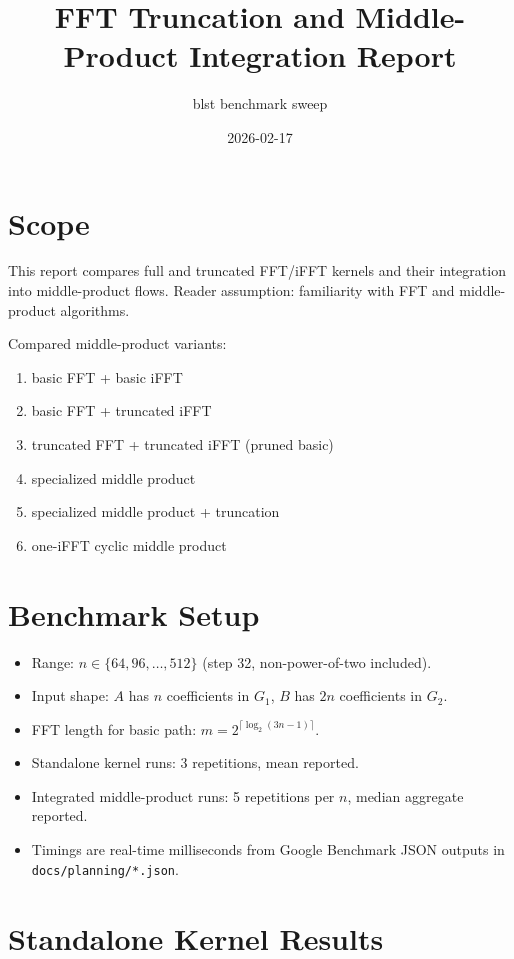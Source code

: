 \documentclass[11pt]{article}
\begin{document}
\title{FFT Truncation and Middle-Product Integration Report}
\author{blst benchmark sweep}
\date{2026-02-17}
\maketitle

\section{Scope}
This report compares full and truncated FFT/iFFT kernels and their integration into middle-product flows.
Reader assumption: familiarity with FFT and middle-product algorithms.

Compared middle-product variants:
\begin{enumerate}
\item basic FFT + basic iFFT
\item basic FFT + truncated iFFT
\item truncated FFT + truncated iFFT (pruned basic)
\item specialized middle product
\item specialized middle product + truncation
\item one-iFFT cyclic middle product
\end{enumerate}

\section{Benchmark Setup}
\begin{itemize}
\item Range: \(n \in \{64,96,\ldots,512\}\) (step 32, non-power-of-two included).
\item Input shape: \(A\) has \(n\) coefficients in \(G_1\), \(B\) has \(2n\) coefficients in \(G_2\).
\item FFT length for basic path: \(m = 2^{\lceil \log_2(3n-1) \rceil}\).
\item Standalone kernel runs: 3 repetitions, mean reported.
\item Integrated middle-product runs: 5 repetitions per \(n\), median aggregate reported.
\item Timings are real-time milliseconds from Google Benchmark JSON outputs in \texttt{docs/planning/*.json}.
\end{itemize}

\section{Standalone Kernel Results}
\end{document}
